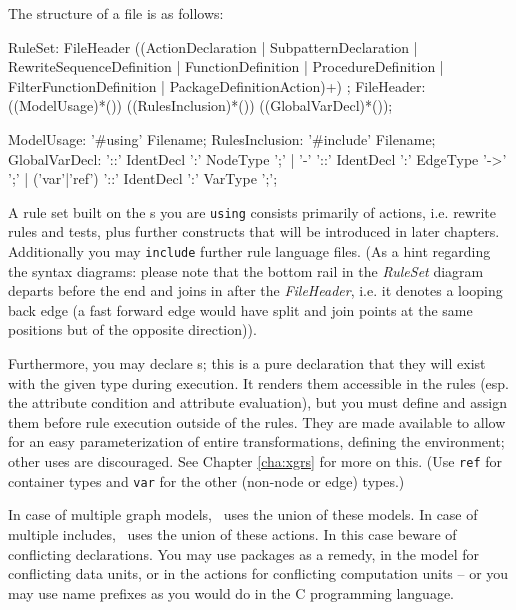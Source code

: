 The structure of a  file is as follows:
\begin{rail}
  RuleSet: FileHeader ((ActionDeclaration | SubpatternDeclaration | RewriteSequenceDefinition | FunctionDefinition | ProcedureDefinition | FilterFunctionDefinition | PackageDefinitionAction)+) ;
  FileHeader: ((ModelUsage)*()) ((RulesInclusion)*()) ((GlobalVarDecl)*());
\end{rail}
\pagebreak %
\begin{rail}
  ModelUsage: '\#using' Filename;
  RulesInclusion: '\#include' Filename;
  GlobalVarDecl: '::' IdentDecl ':' NodeType ';' | '-' '::' IdentDecl ':' EdgeType '->' ';' | ('var'|'ref') '::' IdentDecl ':' VarType ';';
\end{rail}

A rule set built on the s you are \texttt{using}
consists primarily of actions, i.e. rewrite rules and tests,
plus further constructs that will be introduced in later chapters.
Additionally you may \texttt{include} further rule language files.
(As a hint regarding the syntax diagrams: please note that the bottom rail in the \emph{RuleSet} diagram departs before the end and joins in after the \emph{FileHeader}, i.e. it denotes a looping back edge (a fast forward edge would have split and join points at the same positions but of the opposite direction)).

Furthermore, you may declare s; this is a pure declaration that they will exist with the given type during execution. It renders them accessible in the rules (esp. the attribute condition and attribute evaluation), but you must define and assign them  before rule execution outside of the rules. They are made available to allow for an easy parameterization of entire transformations, defining the environment; other uses are discouraged. See Chapter \ref{cha:xgrs} for more on this.
(Use \texttt{ref} for container types and \texttt{var} for the other (non-node or edge) types.)

In case of multiple graph models, \GrG\ uses the union of these models. 
In case of multiple includes, \GrG\ uses the union of these actions. 
In this case beware of conflicting declarations.
You may use packages as a remedy, in the model for conflicting data units, or in the actions for conflicting computation units -- or you may use name prefixes as you would do in the C programming language.

